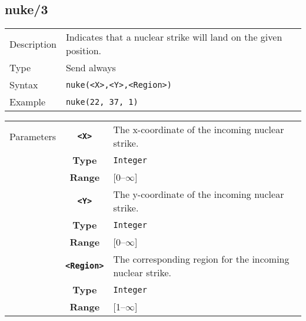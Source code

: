 \subsection{nuke/3}
\begin{tabularx}{\textwidth}{lX}
 Description & Indicates that a nuclear strike will land on the given position. \\
 Type & Send always \\
 Syntax & \verb|nuke(<X>,<Y>,<Region>)| \\
 Example & \verb|nuke(22, 37, 1)|   \\
 \end{tabularx}
 \begin{tabularx}{\textwidth}{l | c | p{8cm}|}
 \cline{2-3}
 Parameters & \textbf{\verb|<X>|} & The x-coordinate of the incoming nuclear strike.\\
            & \textbf{Type} & \verb|Integer| \\
            &\textbf{Range} &  [0--$\infty$] \\
            \cline{2-3}
            & \textbf{\verb|<Y>|} & The y-coordinate of the incoming nuclear strike.\\
            & \textbf{Type} & \verb|Integer| \\
            &\textbf{Range} & [0--$\infty$] \\
            \cline{2-3}
            & \textbf{\verb|<Region>|} & The corresponding region for the incoming nuclear strike.\\
            & \textbf{Type} & \verb|Integer| \\
            &\textbf{Range} & [1--$\infty$] \\
            \cline{2-3}
\end{tabularx}

